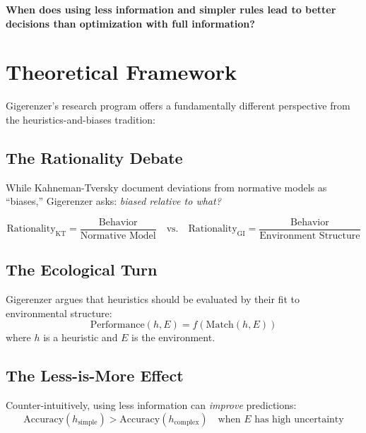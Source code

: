 \begin{tcolorbox}[colback=red!5!white, colframe=red!75!black,
    title=The Fundamental Question]
\textbf{When does using less information and simpler rules lead to better decisions than optimization with full information?}
\end{tcolorbox}


\section{Theoretical Framework}
\label{sec:gi-theory}

Gigerenzer's research program offers a fundamentally different perspective from the heuristics-and-biases tradition:

\subsection{The Rationality Debate}

While Kahneman-Tversky document deviations from normative models as ``biases,'' Gigerenzer asks: \textit{biased relative to what?}

\begin{equation}
\text{Rationality}_{\text{KT}} = \frac{\text{Behavior}}{\text{Normative Model}} \quad \text{vs.} \quad
\text{Rationality}_{\text{GI}} = \frac{\text{Behavior}}{\text{Environment Structure}}
\end{equation}

\subsection{The Ecological Turn}

Gigerenzer argues that heuristics should be evaluated by their fit to environmental structure:
\begin{equation}
\text{Performance}(h, E) = f(\text{Match}(h, E))
\end{equation}
where $h$ is a heuristic and $E$ is the environment.

\subsection{The Less-is-More Effect}

Counter-intuitively, using less information can \textit{improve} predictions:
\begin{equation}
\text{Accuracy}(h_{\text{simple}}) > \text{Accuracy}(h_{\text{complex}}) \quad \text{when } E \text{ has high uncertainty}
\end{equation}



